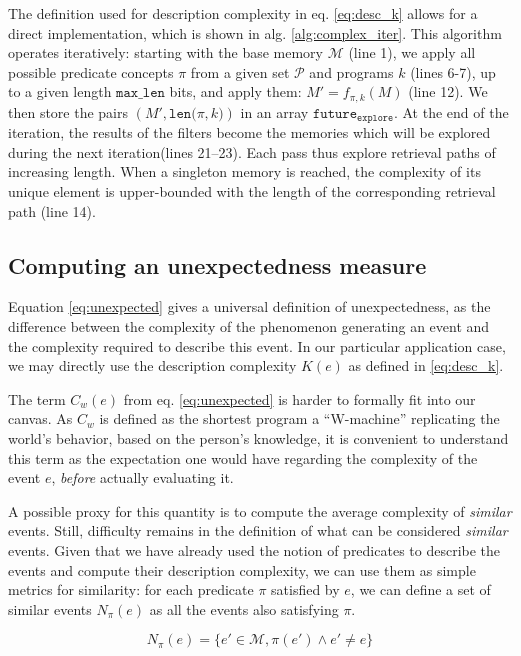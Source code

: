 \documentclass[conference]{IEEEtran}
\begin{document}
The definition used for description complexity in eq. \ref{eq:desc_k} allows for
a direct implementation, which is shown in alg. \ref{alg:complex_iter}. This
algorithm operates iteratively: starting with the base memory $\mathcal{M}$
(line 1), we apply all possible predicate concepts $\pi$ from a given set
$\mathcal{P}$ and programs $k$ (lines 6-7), up to a given length $\mathtt
{max\_len}$ bits, and apply them: $M' = f_{\pi, k}(M)$ (line 12). We then store
the pairs $(M', \mathtt{len(}\pi, k\mathtt{)})$ in an array $\mathtt{future_
{explore}}$. At the end of the iteration, the results of the filters become the
memories which will be explored during the next iteration(lines 21--23). Each
pass thus explore retrieval paths of increasing length. When a singleton memory
is reached, the complexity of its unique element is upper-bounded with the
length of the corresponding retrieval path (line 14).

\subsection{Computing an unexpectedness measure}
Equation \ref{eq:unexpected} gives a universal definition of unexpectedness, as
the difference between the complexity of the phenomenon generating an event and
the complexity required to describe this event. In our particular application
case, we may directly use the description complexity $K(e)$ as defined in
\ref{eq:desc_k}.

The term $C_{w}(e)$ from eq. \ref{eq:unexpected} is harder to formally
fit into our canvas. As $C_{w}$ is defined as the shortest program a
``W-machine'' replicating the world's behavior, based on the person's
knowledge\cite{dessalles2011coincidences}, it is convenient to understand this
term as the expectation one would have regarding the complexity of the event
$e$, \emph{before} actually evaluating it.

A possible proxy for this quantity is to compute the average complexity
of \emph{similar} events. Still, difficulty remains in the definition of what
can be considered \emph{similar} events. Given that we have already used the
notion of predicates to describe the events and compute their description
complexity, we can use them as simple metrics for similarity: for each predicate
$\pi$ satisfied by $e$, we can define a set of similar events $N_{\pi}(e)$ as
all the events also satisfying $\pi$.

\begin{equation}
\label{eq:similar}
N_{\pi}(e) = \{e'\in \mathcal{M}, \pi(e') \wedge e' \neq e\}
\end{equation}
\end{document}

